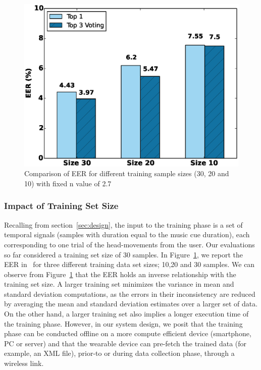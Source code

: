 \begin{figure}[t]
\centering
\includegraphics [width=\columnwidth]{figure/exp2_vary_size.eps}
\caption{Comparison of EER for different training sample sizes (30, 20 and 10)
with fixed n value of 2.7}
\label{fig:eer-size}
\end{figure}


\subsubsection{Impact of Training Set Size}
Recalling from \systemname section~\ref{sec:design}, the input to the training phase
is a set of temporal signals (samples with duration equal to the music cue
duration), each corresponding to one trial of the head-movements from the
user. Our evaluations so far considered a training set size of 30 samples.
In Figure~\ref{fig:eer-size}, we report the EER in \systemname~for three
different training data set sizes; 10,20 and 30 samples.
We can observe from Figure~\ref{fig:eer-size} that the EER holds an inverse
relationship with the training set size. A larger training set minimizes the
variance in mean and standard deviation computations, as the errors in their
inconsistency are reduced by averaging the mean and standard deviation
estimates over a larger set of data.
On the other hand, a larger training set also implies a longer execution time
of the training phase.
However, in our system design, we posit that the training phase can be
conducted
offline on a more compute efficient device (smartphone, PC or server) and that
the wearable device can pre-fetch the trained data (for example, an XML file),
prior-to or during data collection phase, through a wireless link.
